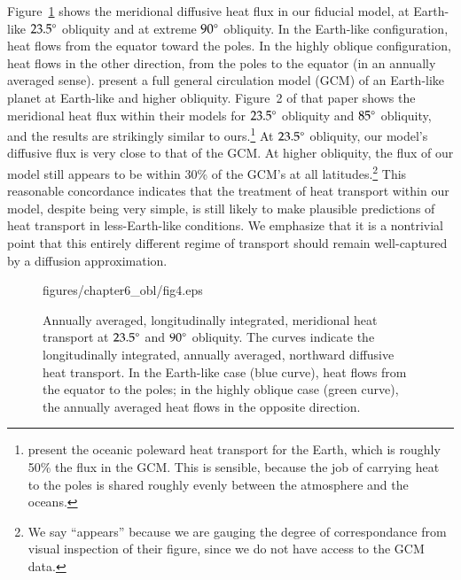 Figure~\ref{obl_fig:set80merid_heat_flux} shows the meridional
diffusive heat flux in our fiducial model, at Earth-like $23.5\degr$
obliquity and at extreme $90\degr$ obliquity.  In the Earth-like
configuration, heat flows from the equator toward the poles.  In the
highly oblique configuration, heat flows in the other direction, from
the poles to the equator (in an annually averaged sense).
\citet{williams+pollard2003} present a full general circulation model
(GCM) of an Earth-like planet at Earth-like and higher obliquity.
Figure~2 of that paper shows the meridional heat flux within their
models for $23.5\degr$ obliquity and $85\mbox{$^\circ$}$ obliquity, and the
results are strikingly similar to
ours.\footnote{\citet{trenberth+solomon1994} present the oceanic
poleward heat transport for the Earth, which is roughly 50\% the flux
in the GCM.  This is sensible, because the job of carrying heat to the
poles is shared roughly evenly between the atmosphere and the oceans.}
At $23.5\degr$ obliquity, our model's diffusive flux is very close to
that of the GCM.  At higher obliquity, the flux of our model still
appears to be within 30\% of the GCM's at all latitudes.\footnote{We
say ``appears'' because we are gauging the degree of correspondance
from visual inspection of their figure, since we do not have access to
the GCM data.}  This reasonable concordance indicates that the
treatment of heat transport within our model, despite being very
simple, is still likely to make plausible predictions of heat
transport in less-Earth-like conditions.  We emphasize that it is a
nontrivial point that this entirely different regime of transport
should remain well-captured by a diffusion approximation.

\begin{figure}[p]
\plotone
{figures/chapter6_obl/fig4.eps}
\caption[Annually averaged, longitudinally integrated, meridional heat
transport at $23.5\degr$ and $90\degr$ obliquity.]{Annually averaged,
longitudinally integrated, meridional heat transport at $23.5\degr$
and $90\degr$ obliquity.  The curves indicate the longitudinally
integrated, annually averaged, northward diffusive heat transport.  In
the Earth-like case (blue curve), heat flows from the equator to the
poles; in the highly oblique case (green curve), the annually averaged
heat flows in the opposite direction.}
\label{obl_fig:set80merid_heat_flux}
\end{figure}


\afterpage{\clearpage}



